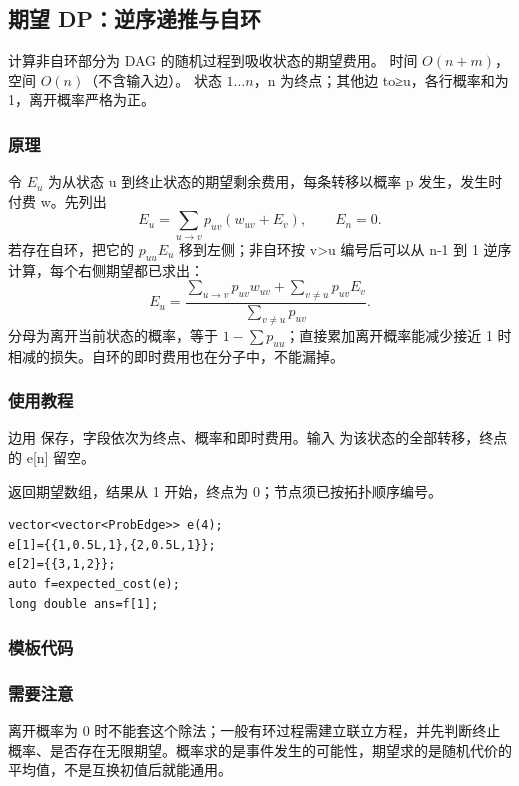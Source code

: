 \subsection{期望 DP：逆序递推与自环}
\label{dp:expectation-dp}
\AlgorithmInfo
    {计算非自环部分为 DAG 的随机过程到吸收状态的期望费用。}
    {时间 $O(n+m)$，空间 $O(n)$（不含输入边）。}
    {状态 $1\ldots n$，n 为终点；其他边 to≥u，各行概率和为 1，离开概率严格为正。}
\subsubsection*{原理}

令 $E_u$ 为从状态 u 到终止状态的期望剩余费用，每条转移以概率 p 发生，发生时付费 w。先列出
\[
 E_u=\sum_{u\to v}p_{uv}(w_{uv}+E_v),\qquad E_n=0.
\]
若存在自环，把它的 $p_{uu}E_u$ 移到左侧；非自环按 v>u 编号后可以从 n-1 到 1 逆序计算，每个右侧期望都已求出：
\[
 E_u=\frac{\sum_{u\to v}p_{uv}w_{uv}+\sum_{v\ne u}p_{uv}E_v}
 {\sum_{v\ne u}p_{uv}}.
\]
分母为离开当前状态的概率，等于 $1-\sum p_{uu}$；直接累加离开概率能减少接近 1 时相减的损失。自环的即时费用也在分子中，不能漏掉。

\subsubsection*{使用教程}
边用  保存，字段依次为终点、概率和即时费用。输入  为该状态的全部转移，终点的 e[n] 留空。

 返回期望数组，结果从 1 开始，终点为 0；节点须已按拓扑顺序编号。
\begin{lstlisting}[style=mtycpp,numbers=none]
vector<vector<ProbEdge>> e(4);
e[1]={{1,0.5L,1},{2,0.5L,1}};
e[2]={{3,1,2}};
auto f=expected_cost(e);
long double ans=f[1];
\end{lstlisting}
\subsubsection*{模板代码}
\subsubsection*{需要注意}
离开概率为 0 时不能套这个除法；一般有环过程需建立联立方程，并先判断终止概率、是否存在无限期望。概率求的是事件发生的可能性，期望求的是随机代价的平均值，不是互换初值后就能通用。
